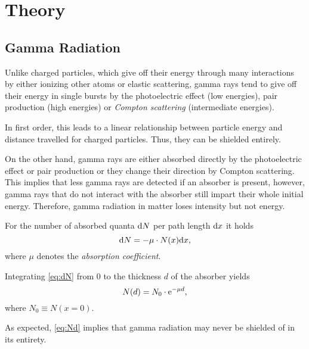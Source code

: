 \chapter{Theory}

\section{Gamma Radiation}
Unlike charged particles, which give off their energy through many interactions by either ionizing other atoms or elastic scattering, gamma rays tend to give off their energy in single bursts by the photoelectric effect (low energies), pair production (high energies) or \textit{Compton scattering} (intermediate energies).

In first order, this leads to a linear relationship between particle energy and distance travelled for charged particles. Thus, they can be shielded entirely.

On the other hand, gamma rays are either absorbed directly by the photoelectric effect or pair production or they change their direction by Compton scattering. This implies that less gamma rays are detected if an absorber is present, however, gamma rays that do not interact with the absorber still impart their whole initial energy. Therefore, gamma radiation in matter loses intensity but not energy.

For the number of absorbed quanta $\text{d} N$ per path length $\text{d} x$ it holds
\begin{equation}\label{eq:dN}
	\text{d} N = -\mu\cdot N(x)\text{d} x,
\end{equation}
where $\mu$ denotes the \textit{absorption coefficient}.

Integrating \autoref{eq:dN} from 0 to the thickness $d$ of the absorber yields
\begin{equation}\label{eq:Nd}
	N(d) = N_0\cdot\mathrm{e}^{-\mu d},
\end{equation}
where $N_0\equiv N(x=0)$.

As expected, \autoref{eq:Nd} implies that gamma radiation may never be shielded of in its entirety.

